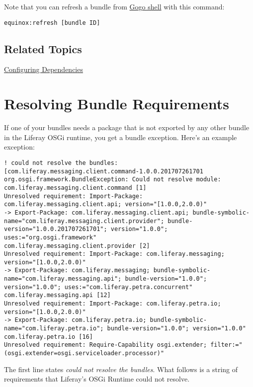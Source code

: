 Note that you can refresh a bundle from
\href{/docs/7-2/customization/-/knowledge_base/c/using-the-felix-gogo-shell}{Gogo
shell} with this command:

\begin{verbatim}
equinox:refresh [bundle ID] 
\end{verbatim}

\section{Related Topics}\label{related-topics-33}

\href{/docs/7-2/customization/-/knowledge_base/c/configuring-dependencies}{Configuring
Dependencies}

\chapter{Resolving Bundle
Requirements}\label{resolving-bundle-requirements}

If one of your bundles needs a package that is not exported by any other
bundle in the Liferay OSGi runtime, you get a bundle exception. Here's
an example exception:

\begin{verbatim}
! could not resolve the bundles: [com.liferay.messaging.client.command-1.0.0.201707261701 org.osgi.framework.BundleException: Could not resolve module: com.liferay.messaging.client.command [1]
Unresolved requirement: Import-Package: com.liferay.messaging.client.api; version="[1.0.0,2.0.0)"
-> Export-Package: com.liferay.messaging.client.api; bundle-symbolic-name="com.liferay.messaging.client.provider"; bundle-version="1.0.0.201707261701"; version="1.0.0"; uses:="org.osgi.framework"
com.liferay.messaging.client.provider [2]
Unresolved requirement: Import-Package: com.liferay.messaging; version="[1.0.0,2.0.0)"
-> Export-Package: com.liferay.messaging; bundle-symbolic-name="com.liferay.messaging.api"; bundle-version="1.0.0"; version="1.0.0"; uses:="com.liferay.petra.concurrent"
com.liferay.messaging.api [12]
Unresolved requirement: Import-Package: com.liferay.petra.io; version="[1.0.0,2.0.0)"
-> Export-Package: com.liferay.petra.io; bundle-symbolic-name="com.liferay.petra.io"; bundle-version="1.0.0"; version="1.0.0"
com.liferay.petra.io [16]
Unresolved requirement: Require-Capability osgi.extender; filter:="(osgi.extender=osgi.serviceloader.processor)"
\end{verbatim}

The first line states \emph{could not resolve the bundles}. What follows
is a string of requirements that Liferay's OSGi Runtime could not
resolve.

